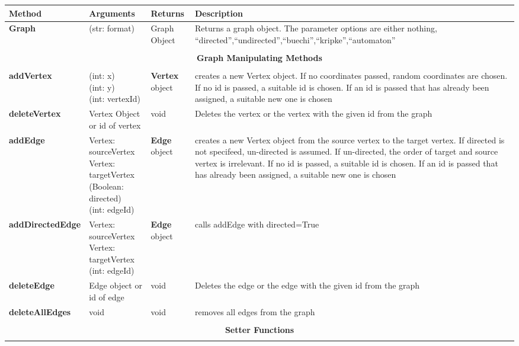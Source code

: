 \documentclass{article}
\newlength\q
\newlength\smallCol
\newlength\argsLen
\begin{document}
\begin{table}[h]
\begin{tabular}{m{\smallCol}m{\argsLen}m{\smallCol}m{\q}}
Method & Arguments & Returns & Description \\ \hline
\textbf{Graph}& (str: format) & Graph Object & Returns a graph object. The parameter options are either nothing, ``directed'',``undirected'',``buechi'',``kripke'',``automaton'' \\\hline
\\\multicolumn{4}{c}{\textbf{Graph Manipulating Methods}}\\\\\hline
\textbf{addVertex}  & \makecell{(int: x)\\(int: y)\\(int: vertexId)} & \textbf{Vertex} object & creates a new Vertex object. If no coordinates passed, random coordinates are chosen. If no id is passed, a suitable id is chosen. If an id is passed that has already been assigned, a suitable new one is chosen\\\hline
\textbf{deleteVertex} & Vertex Object or id of vertex & void & Deletes the vertex or the vertex with the given id from the graph\\ \hline
\textbf{addEdge} & \makecell{Vertex: sourceVertex\\Vertex: targetVertex\\(Boolean: directed) \\ (int: edgeId)} & \textbf{Edge} object & creates a new Vertex object from the source vertex to the target vertex. If directed is not specifeed, un-directed is assumed. If un-directed, the order of target and source vertex is irrelevant. If no id is passed, a suitable id is chosen. If an id is passed that has already been assigned, a suitable new one is chosen \\ \hline
\textbf{addDirectedEdge} & \makecell{Vertex: sourceVertex\\Vertex: targetVertex \\ (int: edgeId)} & \textbf{Edge} object & calls addEdge with directed=True \\ \hline
\textbf{deleteEdge} & Edge object or id of edge & void &  Deletes the edge or the edge with the given id from the graph\\ \hline
\textbf{deleteAllEdges} & void & void & removes all edges from the graph \\ \hline
\\\multicolumn{4}{c}{\textbf{Setter Functions}}\\\\\hline

\end{tabular}
\end{table}
\end{document}
